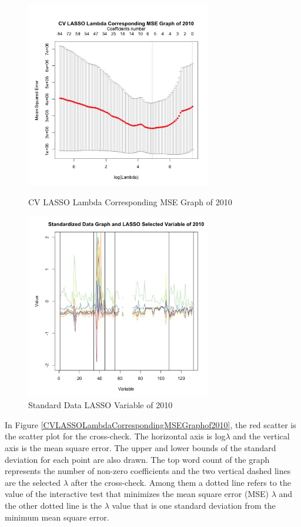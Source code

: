 \documentclass{mcmthesis}
\begin{document}
\begin{figure}[H]
\centering
\begin{minipage}[t]{0.45\textwidth}
\centering
\includegraphics[width=3.2in]{figures/CVLASSOLambdaCorrespondingMSEGraphof2010.jpeg}
\caption{CV LASSO Lambda Corresponding MSE Graph of 2010}
\label{CVLASSOLambdaCorrespondingMSEGraphof2010}
\end{minipage}
\hfill
\begin{minipage}[t]{0.45\textwidth}
\centering
\includegraphics[width=3.2in]{figures/StandardDataLASSOVariableof2010.jpeg}
\caption{Standard Data LASSO Variable of 2010}
\label{StandardDataLASSOVariableof2010}
\end{minipage}
\end{figure}
 
In Figure \ref{CVLASSOLambdaCorrespondingMSEGraphof2010}, the red scatter is the scatter plot for the cross-check. The horizontal axis is log$\lambda$ and the vertical axis is the mean square error. The upper and lower bounds of the standard deviation for each point are also drawn.  The top word count of the graph represents the number of non-zero coefficients and the two vertical dashed lines are the selected $\lambda$ after the cross-check.  Among them a dotted line refers to the value of the interactive test that minimizes the mean square error (MSE) $\lambda$ and the other dotted line is the $\lambda$ value that is one standard deviation from the minimum mean square error.
\end{document}
